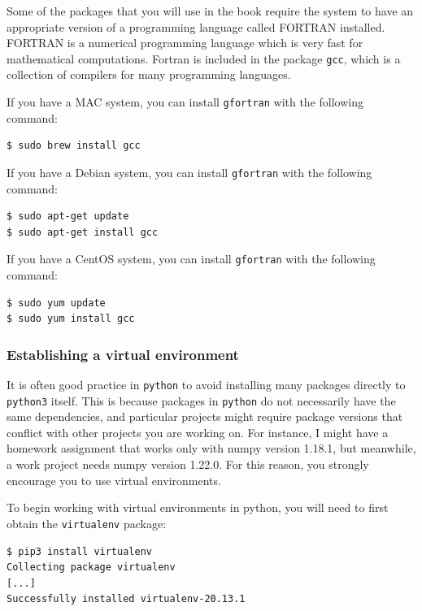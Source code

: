 Some of the packages that you will use in the book require the system to have an appropriate version of a programming language called FORTRAN installed. FORTRAN is a numerical programming language which is very fast for mathematical computations. Fortran is included in the package \texttt{gcc}, which is a collection of compilers for many programming languages.

If you have a MAC system, you can install \texttt{gfortran} with the following command:

\begin{lstlisting}[style=bash]
$ sudo brew install gcc
\end{lstlisting}

If you have a Debian system, you can install \texttt{gfortran} with the following command:

\begin{lstlisting}[style=bash]
$ sudo apt-get update
$ sudo apt-get install gcc
\end{lstlisting}

If you have a CentOS system, you can install \texttt{gfortran} with the following command:

\begin{lstlisting}[style=bash]
$ sudo yum update
$ sudo yum install gcc
\end{lstlisting}

\subsubsection{Establishing a virtual environment}

It is often good practice in \texttt{python} to avoid installing many packages directly to \texttt{python3} itself. This is because packages in \texttt{python} do not necessarily have the same dependencies, and particular projects might require package versions that conflict with other projects you are working on. For instance, I might have a homework assignment that works only with numpy version 1.18.1, but meanwhile, a work project needs numpy version 1.22.0. For this reason, you strongly encourage you to use virtual environments.

To begin working with virtual environments in python, you will need to first obtain the \texttt{virtualenv} package:

\begin{lstlisting}[style=bash]
$ pip3 install virtualenv
Collecting package virtualenv
[...]
Successfully installed virtualenv-20.13.1
\end{lstlisting}

